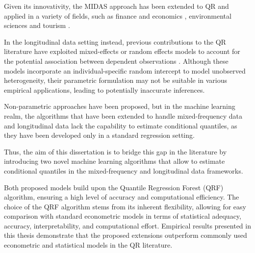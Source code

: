 \vspace{0.15in}

\noindent Given its innovativity, the MIDAS approach has been extended to QR and applied in a variety of fields, such as finance and economics \citep{kuzin2009midas, andreani2021multivariate, candila2023mixed}, environmental sciences \citep{oloko2022climate, jiang2023carbon} and tourism \citep{bangwayo2015can, wen2021forecasting}.

\vspace{0.15in}

\noindent In the longitudinal data setting instead, previous contributions to the QR literature have exploited mixed-effects or random effects models to account for the potential association between dependent observations \citep{farcomeni2012quantile, smith2015multilevel, alfo2017finite, marino2018mixed, merlo2021forecasting,merlo2022quantile,merlo2022quantilets}. Although these models incorporate an individual-specific random intercept to model unobserved heterogeneity, their parametric formulation may not be suitable in various empirical applications, leading to potentially inaccurate inferences.

\vspace{0.15in}

\noindent Non-parametric approaches have been proposed, but in the machine learning realm, the algorithms that have been extended to handle mixed-frequency data \citep{xu2019artificial} and longitudinal data \citep{xiong2019mixed, luts2012mixed, hajjem2014mixed, hajjem2011mixed, sela2012re}  lack the capability to estimate conditional quantiles, as they have been developed only in a standard regression setting.

\vspace{0.15in}

\noindent Thus, the aim of this dissertation is to bridge this gap in the literature by introducing two novel machine learning algorithms that allow to estimate conditional quantiles in the mixed-frequency and longitudinal data frameworks.

\vspace{0.15in}

\noindent Both proposed models build upon the Quantile Regression Forest (QRF) algorithm, ensuring a high level of accuracy and computational efficiency. The choice of the QRF algorithm stems from its inherent flexibility, allowing for easy comparison with standard econometric models in terms of statistical adequacy, accuracy, interpretability, and computational effort. Empirical results presented in this thesis demonstrate that the proposed extensions outperform commonly used econometric and statistical models in the QR literature.

